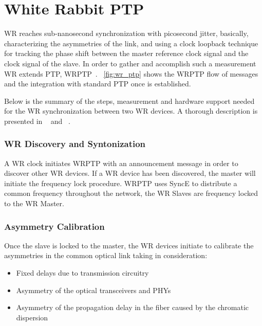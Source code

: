 \section{White Rabbit PTP}
\label{sec:wr}

WR reaches sub-nanosecond synchronization with picosecond jitter, basically, 
characterizing the asymmetries of the link, and using a clock loopback
technique for tracking the phase shift between the master reference clock
signal and the clock signal of the slave. In order to gather and
accomplish such a measurement WR extends PTP, WRPTP~\cite{biblio:ispcs_m}. 
\figurename~\ref{fig:wr_ptp} shows the WRPTP flow of messages and the
integration with standard PTP once is established.

Below is the summary of the steps, measurement and hardware support needed for the 
WR synchronization between two WR devices. A thorough description is presented 
in ~\cite{biblio:tomas} and ~\cite{biblio:wrptp}.

\subsubsection{WR Discovery and Syntonization}

A WR clock initiates WRPTP with an announcement message in order to discover
other WR devices. If a WR device has been discovered, the master will initiate the 
frequency lock procedure. WRPTP uses SyncE to distribute a common frequency throughout 
the network, the WR Slaves are frequency locked to the WR Master. 

\subsubsection{Asymmetry Calibration}

Once the slave is locked to the master, the WR devices initiate to calibrate the 
asymmetries in the common optical link taking in consideration:

\begin{itemize}
    \item Fixed delays due to transmission circuitry
    \item Asymmetry of the optical transceivers and PHYs 
    \item Asymmetry of the propagation delay in the fiber caused by the chromatic dispersion
\end{itemize}

